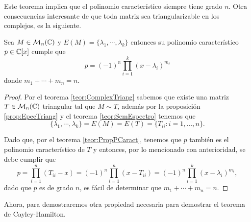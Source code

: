 Este teorema implica que el polinomio característico siempre tiene grado $n$. Otra consecuencias interesante de que toda matriz sea triangularizable en los complejos, es la siguiente.

\begin{prop} \label{prop:FormCaracComplex}
  Sea $M \in \mathcal{M}_n(\mathbb{C})$ y $E(M) = \{\lambda_1, \cdots, \lambda_k\}$ entonces su polinomio característico $p \in \mathbb{C}[x]$ cumple que
    \[
      p = (-1)^n \prod_{i=1}^k (x-\lambda_i)^{m_i}
    \]
  donde $m_1 + \cdots + m_n = n$.
\end{prop}
\begin{proof}
  Por el teorema \ref{teor:ComplexTriang} sabemos que existe una matriz $T \in \mathcal{M}_n(\mathbb{C})$ triangular tal que $M \sim T$, además por la proposición \ref{prop:EpecTriang} y el teorema \ref{teor:SemEspectro} tenemos que
    \[ \{\lambda_1, \cdots, \lambda_k\} = E(M) = E(T) = \{T_{ii} : i = 1,\ldots,n\}. \]
  
  Dado que, por el teorema \ref{teor:PropPCaract}, tenemos que $p$ también es el polinomio característico de $T$ y entonces, por lo mencionado con anterioridad, se debe cumplir que 
    \[
    p = \prod_{i=1}^n (T_{ii} -x ) = (-1)^n \prod_{i=1}^n (x-T_{ii}) = (-1)^n \prod_{i=1}^k (x-\lambda_i)^{m_i},
    \]
  dado que $p$ es de grado $n$, es fácil de determinar que $m_1 + \cdots + m_n = n$.
\end{proof}

Ahora, para demostraremos otra propiedad necesaria para demostrar el teorema de Cayley-Hamilton.

